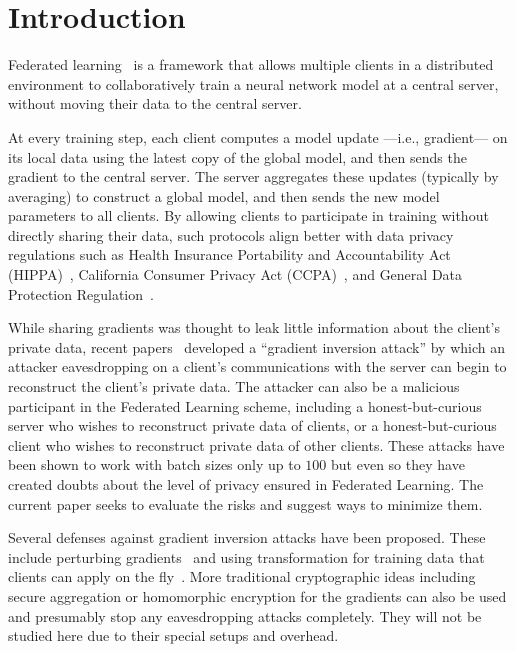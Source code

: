 
\section{Introduction}

Federated learning~\citep{mcmahan2016communication,kairouz2019advances} is a framework that allows multiple clients in a distributed environment to collaboratively train a neural network model at a central server, without moving their data to the central server. 

At every training step, each client computes a model update ---i.e., gradient--- on its local data using the latest copy of the global model, and then sends the gradient to the central server. The server aggregates these updates (typically by averaging) to construct a global model, and then sends the new model parameters to all clients. 
By allowing clients to participate in training without directly sharing their data, such protocols align better with data privacy regulations such as Health Insurance Portability and Accountability Act (HIPPA)~\citep{hippa}, California Consumer Privacy Act (CCPA)~\citep{ccpa}, and General Data Protection Regulation~\citep{gdpr}.

While  sharing gradients was thought to leak little information about the client's private data, recent papers~\citep{zhu2020deep, zhao2020idlg, geiping2020inverting, yin2021see}  developed a  ``gradient inversion attack'' by which an attacker eavesdropping on a client's communications with the server can begin to reconstruct the client's private data. 
The attacker can also be a malicious participant in the Federated Learning scheme, including a honest-but-curious server who wishes to reconstruct private data of clients, or a honest-but-curious client who wishes to reconstruct private data of other clients. These attacks have been shown to work with batch sizes only up to $100$ but even so they have created doubts about the level of privacy ensured in Federated Learning. The current paper seeks to evaluate the risks and suggest ways to minimize them. 

Several defenses against gradient inversion attacks have been proposed. These include perturbing gradients~\citep{zhu2020deep, wei2020framework} and using transformation for training data that clients can apply on the fly~\citep{zhang2017mixup, huang2020instahide}. More traditional cryptographic ideas including secure aggregation \citep{bonawitz2016practical} or homomorphic encryption \citep{phong18} for the gradients can also be used and presumably stop any eavesdropping attacks completely. They will not be studied here due to their special setups and overhead. 

